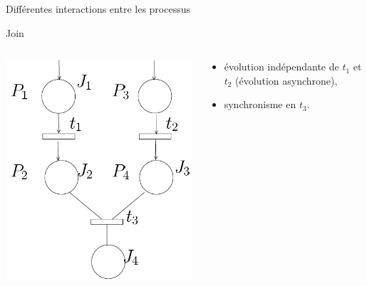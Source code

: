 \documentclass[compress]{beamer}
\begin{document}
\begin{frame}{Différentes interactions entre les processus}
\begin{block}{Join}
\begin{columns}
	\begin{column}{.3\linewidth}
		\begin{center}
			\includegraphics[width=\linewidth]{jun}
		\end{center}
	\end{column}
	\begin{column}{.7\linewidth}
		\begin{itemize}
		\item évolution indépendante de $t_1$ et $t_2$ (évolution asynchrone),
		\item synchronisme en $t_3$.
		\end{itemize}
	\end{column}
\end{columns}
\end{block}
\end{frame}
\end{document}
